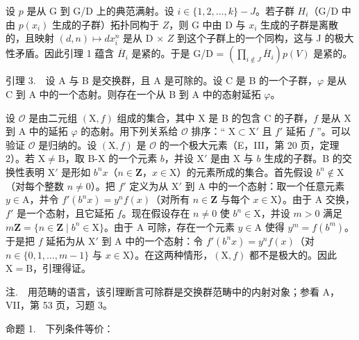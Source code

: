 设 \(p\) 是从 G 到 G/D 上的典范满射。设 \(i \in \{1, 2, \ldots, k\} - J\)。若子群 \(H_i\)（G/D 中由 \(p(x_i)\) 生成的子群）拓扑同构于 \(Z\)，则 G 中由 D 与 \(x_i\) 生成的子群是离散的，且映射 \((d, n) \mapsto dx_i^n\) 是从 D × \(Z\) 到这个子群上的一个同构，这与 J 的极大性矛盾。因此引理 1 蕴含 \(\overline{H}_i\) 是紧的。于是 G/D = \((\prod_{i \not\in J} \overline{H}_i)p(V)\) 是紧的。

引理 3.　设 A 与 B 是交换群，且 A 是可除的。设 C 是 B 的一个子群，\(\varphi\) 是从 C 到 A 中的一个态射。则存在一个从 B 到 A 中的态射延拓 \(\varphi\)。

设 \(\mathcal{O}\) 是由二元组 \((\mathrm{X},f)\) 组成的集合，其中 \(\mathrm{X}\) 是 B 的包含 C 的子群，\(f\) 是从 \(\mathrm{X}\) 到 A 中的延拓 \(\varphi\) 的态射。用下列关系给 \(\mathcal{O}\) 排序：“ \(\mathrm{X} \subset \mathrm{X}'\) 且 \(f'\) 延拓 \(f\) ”。可以验证 \(\mathcal{O}\) 是归纳的。设 \((\mathrm{X},f)\) 是 \(\mathcal{O}\) 的一个极大元素（E，III，第 20 页，定理 2）。若 \(\mathrm{X} \neq \mathrm{B}\)，取 B-X 的一个元素 \(b\)，并设 \(\mathrm{X}'\) 是由 \(\mathrm{X}\) 与 \(b\) 生成的子群。B 的交换性表明 \(\mathrm{X}'\) 是形如 \(b^n x\)（\(n \in \mathbf{Z}\)，\(x \in \mathrm{X}\)）的元素所成的集合。首先假设 \(b^n \notin \mathrm{X}\)（对每个整数 \(n \neq 0\)）。把 \(f'\) 定义为从 \(\mathrm{X}'\) 到 A 中的一个态射：取一个任意元素 \(y \in \mathrm{A}\)，并令 \(f'(b^n x) = y^n f(x)\)（对所有 \(n \in \mathbf{Z}\) 与每个 \(x \in \mathrm{X}\)）。由于 A 交换，\(f'\) 是一个态射，且它延拓 \(f\)。现在假设存在 \(n \neq 0\) 使 \(b^n \in \mathrm{X}\)，并设 \(m > 0\) 满足 \(m\mathbf{Z} = \{n \in \mathbf{Z} \mid b^n \in \mathrm{X}\}\)。由于 A 可除，存在一个元素 \(y \in \mathrm{A}\) 使得 \(y^m = f(b^m)\)。于是把 \(f\) 延拓为从 \(\mathrm{X}'\) 到 A 中的一个态射：令 \(f'(b^n x) = y^n f(x)\)（对 \(n \in \{0,1,\ldots,m-1\}\) 与 \(x \in \mathrm{X}\)）。在这两种情形，\((\mathrm{X},f)\) 都不是极大的。因此 \(\mathrm{X} = \mathrm{B}\)，引理得证。

注.　用范畴的语言，该引理断言可除群是交换群范畴中的内射对象；参看 A，VII，第 53 页，习题 3。

命题 1.　下列条件等价：

